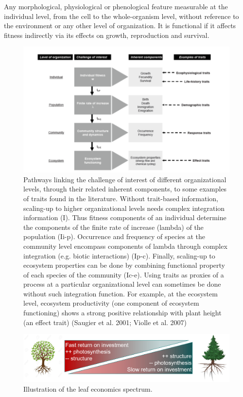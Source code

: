 \documentclass[
  12pt,
  oneside]{book}
\begin{document}
Any morphological, physiological or phenological feature measurable at the individual level, from the cell to the whole-organism level, without reference to the environment or any other level of organization.
It is functional if it affects fitness indirectly via its effects on growth, reproduction and survival.

\begin{figure}

{\centering \includegraphics[width=0.8\linewidth]{figures/chap7/f73_violle2} 

}

\caption{Pathways linking the challenge of interest of different organizational levels, through their related inherent components, to some examples of traits found in the literature. Without trait-based information, scaling-up to higher organizational levels needs complex integration information (I). Thus fitness components of an individual determine the components of the finite rate of increase (lambda) of the population (Ii-p). Occurrence and frequency of species at the community level encompass components of lambda through complex integration (e.g. biotic interactions) (Ip-c). Finally, scaling-up to ecosystem properties can be done by combining functional property of each species of the community (Ic-e). Using traits as proxies of a process at a particular organizational level can sometimes be done without such integration function. For example, at the ecosystem level, ecosystem productivity (one component of ecosystem functioning) shows a strong positive relationship with plant height (an effect trait) (Saugier et al. 2001; Violle et al. 2007)}\label{fig:f73}
\end{figure}

\begin{figure}

{\centering \includegraphics[width=0.8\linewidth]{figures/chap7/f74_LES} 

}

\caption{Illustration of the leaf economics spectrum.}\label{fig:f74}
\end{figure}
\end{document}
